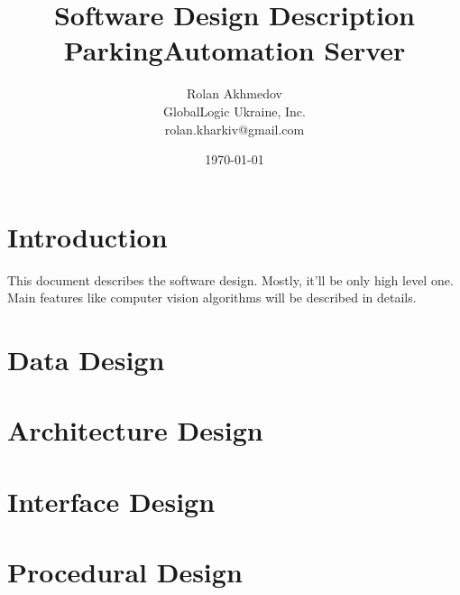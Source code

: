 \documentclass[12pt, a4paper, titlepage]{article}
\title{Software Design Description \\ 
\large ParkingAutomation Server}
\author{Rolan Akhmedov \\ GlobalLogic Ukraine, Inc. \\ rolan.kharkiv@gmail.com }
\date{\today}
\begin{document}
	\maketitle
	
	\section{Introduction}
		This document describes the software design. Mostly, it'll be only high level one.
		Main features like computer vision algorithms will be described in details.
	\section{Data Design}
	\section{Architecture Design}
	\section{Interface Design}
	\section{Procedural Design}
\end{document}
